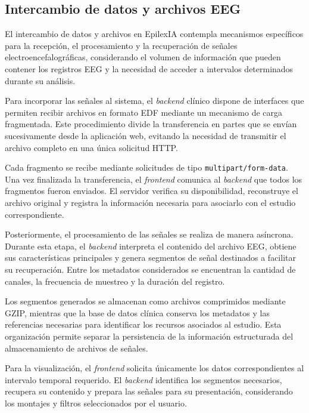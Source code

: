 \subsection{Intercambio de datos y archivos EEG}
\label{subsec:intercambio-datos-archivos-eeg}

El intercambio de datos y archivos en EpilexIA
contempla mecanismos específicos para la recepción,
el procesamiento y la recuperación de señales
electroencefalográficas, considerando el volumen
de información que pueden contener los registros
EEG y la necesidad de acceder a intervalos
determinados durante su análisis.

Para incorporar las señales al sistema, el \textit{backend}
clínico dispone de interfaces que permiten
recibir archivos en formato EDF mediante
un mecanismo de carga fragmentada. Este
procedimiento divide la transferencia en partes
que se envían sucesivamente desde la aplicación
web, evitando la necesidad de transmitir el
archivo completo en una única solicitud HTTP.

Cada fragmento se recibe mediante solicitudes
de tipo \texttt{multipart/form-data}. Una vez
finalizada la transferencia, el \textit{frontend} comunica
al \textit{backend} que todos los fragmentos fueron
enviados. El servidor verifica su disponibilidad,
reconstruye el archivo original y registra
la información necesaria para asociarlo con
el estudio correspondiente.

Posteriormente, el procesamiento de las señales
se realiza de manera asíncrona. Durante esta
etapa, el \textit{backend} interpreta el contenido del
archivo EEG, obtiene sus características
principales y genera segmentos de señal
destinados a facilitar su recuperación.
Entre los metadatos considerados se encuentran
la cantidad de canales, la frecuencia de
muestreo y la duración del registro.

Los segmentos generados se almacenan como
archivos comprimidos mediante GZIP, mientras
que la base de datos clínica conserva los
metadatos y las referencias necesarias para
identificar los recursos asociados al estudio.
Esta organización permite separar la
persistencia de la información estructurada
del almacenamiento de archivos de señales.

Para la visualización, el \textit{frontend} solicita
únicamente los datos correspondientes al
intervalo temporal requerido. El \textit{backend}
identifica los segmentos necesarios, recupera
su contenido y prepara las señales para
su presentación, considerando los montajes
y filtros seleccionados por el usuario.

